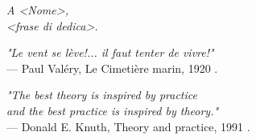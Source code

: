 \thispagestyle{empty}

\begin{flushright}

\vfill 

\textit{A <Nome>, \\
<frase di dedica>.}

\vfill

\emph{"Le vent se lève!... il faut tenter de vivre!"} \\ 
--- Paul Valéry, Le Cimetière marin, 1920 \cite{valery1920marin}.

\vfill 
\vfill
\vfill
\vfill

\end{flushright}

\newpage
\thispagestyle{empty}

\begin{flushright}

\emph{"The best theory is inspired by practice \\
and the best practice is inspired by theory."} \\
--- Donald E. Knuth, Theory and practice, 1991 \cite{knuth1991theory}.

\end{flushright}